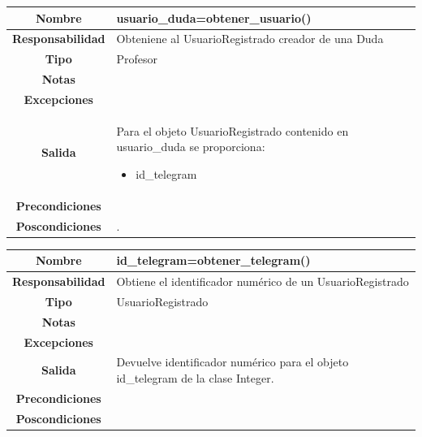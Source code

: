                        \begin{table}[!ht]
\begin{tabular}{|c|m{10cm}|}
\hline\rowcolor{Gray}
{\bf Nombre } & {usuario\_duda=obtener\_usuario()}\\
\hline
{\bf Responsabilidad } & {Obteniene al UsuarioRegistrado creador de una Duda}\\
\hline
\rowcolor{Gray}
{\bf Tipo } & {Profesor} \\
\hline
{\bf Notas } & { } \\
\hline
\rowcolor{Gray}
{\bf Excepciones }& {
} \\
\hline
{\bf Salida }& 
	  { 	
	  Para el objeto UsuarioRegistrado contenido en usuario\_duda se proporciona:
	  \begin{itemize}
	  \item id\_telegram
	  \end{itemize}
	  } 
 \\
\hline
\rowcolor{Gray}
{\bf Precondiciones }& {}\\
\hline
{\bf Poscondiciones }& {}.
  \\
\hline
\end{tabular}

\end{table}



                       \begin{table}[!ht]
\begin{tabular}{|c|m{10cm}|}
\hline\rowcolor{Gray}
{\bf Nombre } & {id\_telegram=obtener\_telegram()}\\
\hline
{\bf Responsabilidad } & {Obtiene el identificador numérico de un UsuarioRegistrado}\\
\hline
\rowcolor{Gray}
{\bf Tipo } & {UsuarioRegistrado} \\
\hline
{\bf Notas } & { } \\
\hline
\rowcolor{Gray}
{\bf Excepciones }& {
} \\
\hline
{\bf Salida }& 
	  { 	
	  Devuelve identificador numérico para el objeto id\_telegram de la clase Integer.
	  } 
 \\
\hline
\rowcolor{Gray}
{\bf Precondiciones }& {}\\
\hline
{\bf Poscondiciones }& {}
  \\
\hline
\end{tabular}

\end{table}



